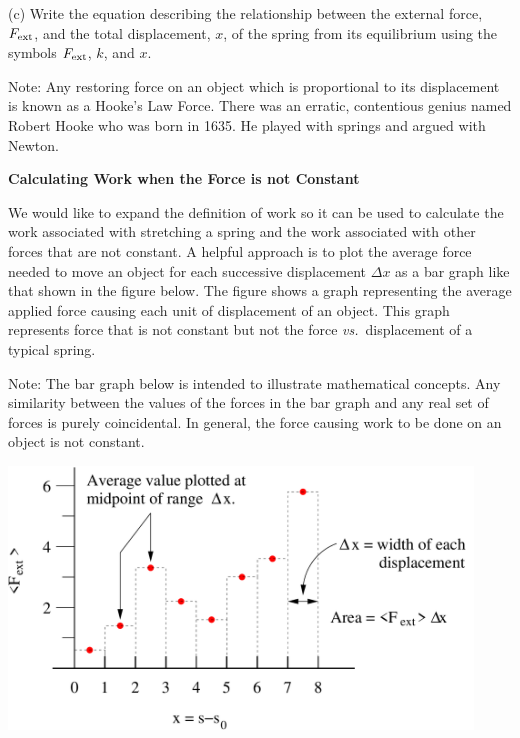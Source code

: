 (c) Write the equation describing the relationship between the external force,
\( F_{\rm ext} \), and the total displacement, 
$x$, of the spring from its equilibrium
using the symbols \( F_{\rm ext} \), $k$, and $x$.
\answerspace{15mm}

Note: Any restoring force on an object which is proportional to its displacement
is known as a Hooke's Law Force. There was an erratic, contentious genius named
Robert Hooke who was born in 1635. He played with springs and argued with 
Newton.

\bigskip
\textbf{Calculating Work when the Force is not Constant }

We would like to expand the definition of work so it can be used to calculate
the work associated with stretching a spring and the work associated with other
forces that are not constant. A helpful approach is to plot the average force
needed to move an object for each successive displacement \( \Delta  x\) as
a bar graph like that shown in the figure below. The figure shows a graph representing
the average applied force causing each unit of displacement of an object. This
graph represents force that is not constant but not the force \textit{vs.}~displacement
of a typical spring.

Note: The bar graph below is intended to illustrate mathematical concepts. Any
similarity between the values of the forces in the bar graph and any real set
of forces is purely coincidental. In general, the force causing work to be done
on an object is not constant.

\vspace{0.3cm}
{\par\centering \includegraphics[height=2.75in]{work_kinetic/workAndKEF1.pdf} \par}
\vspace{0.3cm}

